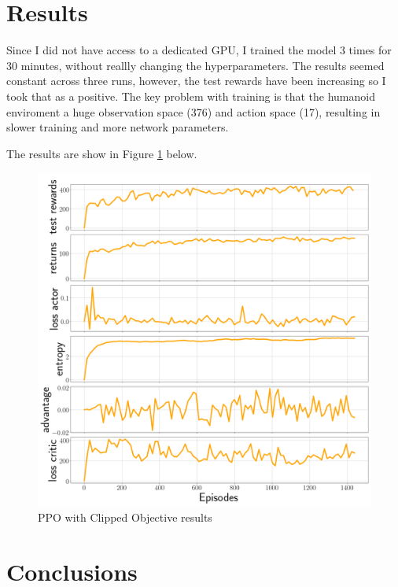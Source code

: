 \documentclass[12pt,a4paper]{article}
\begin{document}
\section{Results}\label{results}

Since I did not have access to a dedicated GPU, I trained the model 3 times for 30 minutes, without reallly changing the hyperparameters. The results seemed constant across three runs, however, the test rewards have been increasing so I took that as a positive. The key problem with training is that the humanoid enviroment a huge observation space (376) and action space (17), resulting in slower training and more network parameters.

The results are show in Figure \ref{img:ppo_clipped} below.

\begin{figure}[H]
\begin{center}
\includegraphics[width=\columnwidth, angle = 0]{img/results.png}
\end{center}
\caption{PPO with Clipped Objective  results \cite{berkley} }
\label{img:ppo_clipped}
\end{figure}

\section{Conclusions}
\end{document}
